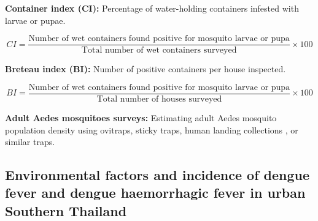 \documentclass[review]{elsarticle}
\begin{document}
\textbf{Container index (CI):} Percentage of water-holding containers infested with larvae or pupae.

\begin{equation}
\label{eq:ci}
CI =  \frac{\textrm{Number of wet containers found positive for mosquito larvae or pupa}}{\textrm{Total number of wet containers surveyed}}  \times 100 
\end{equation}

\textbf{Breteau index (BI):} Number of positive containers per house inspected.

\begin{equation}
\label{eq:bi}
BI =  \frac{\textrm{Number of wet containers found positive for mosquito larvae or pupa}}{\textrm{Total number of houses surveyed}}  \times 100 
\end{equation}

\textbf{Adult Aedes mosquitoes surveys:} Estimating adult Aedes mosquito population density using ovitraps, sticky traps, human landing collections \cite{barnard2014measurement}, or similar traps. 




\subsection{Environmental factors and incidence of dengue fever and dengue haemorrhagic fever in urban Southern Thailand}
\end{document}
